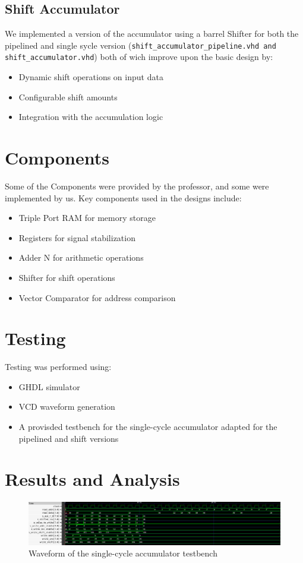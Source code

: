\documentclass[a4paper,12pt]{article}
\begin{document}
\subsection{Shift Accumulator}
We implemented a version of the accumulator using a barrel Shifter for both the pipelined and single sycle version (\texttt{shift\_accumulator\_pipeline.vhd and shift\_accumulator.vhd}) both of wich improve upon the basic design by:
\begin{itemize}
    \item Dynamic shift operations on input data
    \item Configurable shift amounts
    \item Integration with the accumulation logic
\end{itemize}


\section{Components}
Some of the Components were provided by the professor, and some were 
implemented by us.
Key components used in the designs include:
\begin{itemize}
    \item Triple Port RAM for memory storage
    \item Registers for signal stabilization
    \item Adder N for arithmetic operations
    \item Shifter for shift operations
    \item Vector Comparator for address comparison
\end{itemize}

\section{Testing}
Testing was performed using:
\begin{itemize}
    \item GHDL simulator
    \item VCD waveform generation
    \item A provisded testbench for the single-cycle accumulator adapted for the pipelined and shift versions
\end{itemize}

\section{Results and Analysis}
\begin{figure}[H]
    \centering
    \includegraphics[width=0.8\linewidth]{waveform.png}
    \caption{Waveform of the single-cycle accumulator testbench}
    \label{fig:waveform}
\end{figure}
\end{document}
